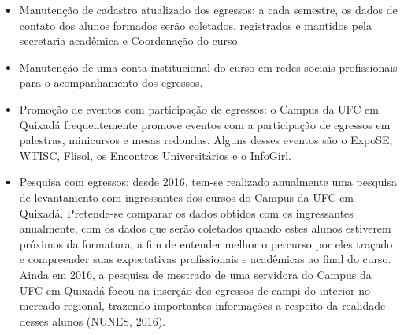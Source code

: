 \begin{itemize}
    \item Manutenção de cadastro atualizado dos egressos: a cada semestre, os dados de contato dos alunos formados serão coletados, registrados e mantidos pela secretaria acadêmica e Coordenação do curso.
    
    \item Manutenção de uma conta institucional do curso em redes sociais profissionais para o acompanhamento dos egressos.
    
    \item Promoção de eventos com participação de egressos: o Campus da UFC em Quixadá frequentemente promove eventos com a participação de egressos em palestras, minicursos e mesas redondas. Alguns desses eventos são o ExpoSE, WTISC, Flisol, os Encontros Universitários e o InfoGirl.
    
    \item Pesquisa com egressos: desde 2016, tem-se realizado anualmente uma pesquisa de levantamento com ingressantes dos cursos do Campus da UFC em Quixadá. Pretende-se comparar os dados obtidos com os ingressantes anualmente, com os dados que serão coletados quando estes alunos estiverem próximos da formatura, a fim de entender melhor o percurso por eles traçado e compreender suas expectativas profissionais e acadêmicas ao final do curso. Ainda em 2016, a pesquisa de mestrado de uma servidora do Campus da UFC em Quixadá focou na inserção dos egressos de campi do interior no mercado regional, trazendo importantes informações a respeito da realidade desses alunos (NUNES, 2016).
\end{itemize}